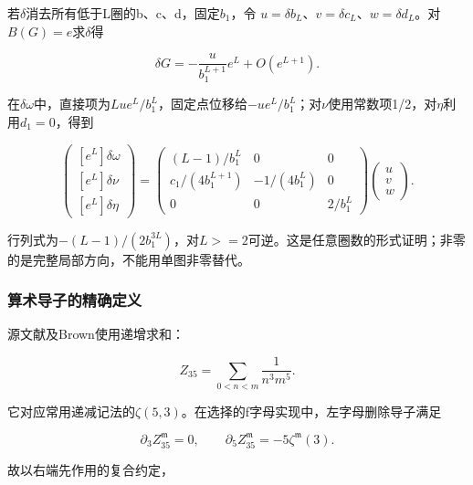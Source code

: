 \documentclass[11pt,a4paper,oneside]{ctexart}
\theoremstyle{cnplain}
\theoremstyle{definition}
\theoremstyle{remark}
\numberwithin{equation}{section}
\begin{document}
若\(\delta\)消去所有低于L圈的b、c、d，固定\(b_1\)，令 \(u=\delta  b_L\)、\(v=\delta  c_L\)、\(w=\delta  d_L\)。对\(B(G)=e\)求\(\delta\)得

\begin{equation}
\delta G=-\frac{u}{b_1^{L+1}}e^L+O(e^{L+1}).
\end{equation}

在\(\delta  \omega\)中，直接项为\(L u e^L/b_1^L\)，固定点位移给\(-u e^L/b_1^L\)；对\(\nu\)使用常数项1/2，对\(\eta\)利用\(d_1=0\)，得到

\begin{equation}
\begin{pmatrix}[e^L]\delta\omega\\{}[e^L]\delta\nu\\{}[e^L]\delta\eta\end{pmatrix}
 =
 \begin{pmatrix}
 (L-1)/b_1^L&0&0\\
 c_1/(4b_1^{L+1})&-1/(4b_1^L)&0\\
 0&0&2/b_1^L
 \end{pmatrix}
 \begin{pmatrix}u\\v\\w\end{pmatrix}.               \label{eq:rg:20}
\end{equation}

行列式为\(-(L-1)/(2b_1^{3L})\)，对\(L>=2\)可逆。这是任意圈数的形式证明；非零的是完整局部方向，不能用单图非零替代。

\subsubsection{算术导子的精确定义}\label{sec:rg:7.1}

源文献\cite[eq.(17)]{kp}及Brown\cite[eq.(2.6)]{brownmzv}使用递增求和：

\begin{equation}
Z_{35}=\sum_{0<n<m}\frac1{n^3m^5}.
\end{equation}

它对应常用递减记法的\(\zeta (5,3)\)。在\cite[§6.1]{brownmzv}选择的f字母实现中，左字母删除导子满足

\begin{equation}
\partial_3 Z_{35}^{\mathfrak m}=0,\qquad
 \partial_5 Z_{35}^{\mathfrak m}=-5\zeta^{\mathfrak m}(3).
\end{equation}

故以右端先作用的复合约定，
\end{document}
